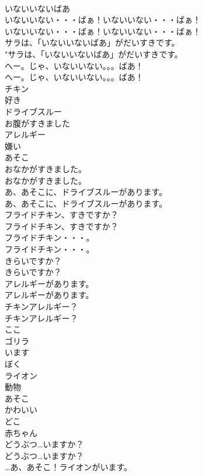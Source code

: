 \documentclass[8pt]{extreport}
\begin{document}
\begin{CJK}{UTF8}{min}
\\	いないいないばあ
\\	いないいない・・・ばぁ！いないいない・・・ばぁ！	
\\	いないいない・・・ばぁ！いないいない・・・ばぁ！ 
\\	サラは、「いないいないばあ」がだいすきです。	
\\	"サラは、「いないいないばあ」がだいすきです。 
\\	へー。じゃ、いないいない。。。ばあ！	
\\	へー。じゃ、いないいない。。。ばあ！ 
\\	チキン
\\	好き
\\	ドライブスルー
\\	お腹がすきました
\\	アレルギー
\\	嫌い
\\	あそこ
\\	おなかがすきました。
\\	おなかがすきました。
\\	あ、あそこに、ドライブスルーがあります。	
\\	あ、あそこに、ドライブスルーがあります。 
\\	フライドチキン、すきですか？	
\\	フライドチキン、すきですか？ 
\\	フライドチキン・・・。	
\\	フライドチキン・・・。 
\\	きらいですか？	
\\	きらいですか？ 
\\	アレルギーがあります。	
\\	アレルギーがあります。 
\\	チキンアレルギー？	
\\	チキンアレルギー？ 
\\	ここ
\\	ゴリラ
\\	います
\\	ぼく
\\	ライオン
\\	動物
\\	あそこ
\\	かわいい
\\	どこ
\\	赤ちゃん
\\	どうぶつ…いますか？	
\\	どうぶつ…いますか？ 
\\	…あ、あそこ！ライオンがいます。	

\end{CJK}
\end{document}
